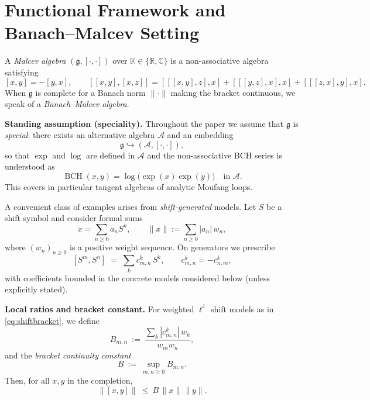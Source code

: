 \documentclass[11pt]{amsart}
\numberwithin{equation}{section}
\theoremstyle{remark}
\newcommand{\BCH}{\operatorname{BCH}}
\begin{document}
\section{Functional Framework and Banach--Malcev Setting}\label{sec:functional}

A \emph{Malcev algebra} $(\mathfrak g,[\cdot,\cdot])$ over $\mathbb K\in\{\mathbb R,\mathbb C\}$ is a non-associative algebra satisfying
\[
[x,y]=-[y,x],\qquad
[[x,y],[x,z]] = [[[x,y],z],x] + [[[y,z],x],x] + [[[z,x],y],x].
\]
When $\mathfrak g$ is complete for a Banach norm $\|\cdot\|$ making the bracket continuous, we speak of a \emph{Banach--Malcev algebra}.

\medskip
\noindent\textbf{Standing assumption (speciality).}
Throughout the paper we assume that $\mathfrak g$ is \emph{special}: there exists an alternative algebra $\mathcal A$ and an embedding
\[
\mathfrak g \hookrightarrow (\mathcal A,[\cdot,\cdot]),
\]
so that $\exp$ and $\log$ are defined in $\mathcal A$ and the non-associative BCH series is understood as
\[
\BCH(x,y)=\log\big(\exp(x)\exp(y)\big)\quad\text{in }\mathcal A.
\]
This covers in particular tangent algebras of analytic Moufang loops.

\medskip
A convenient class of examples arises from \emph{shift-generated} models. Let $S$ be a shift symbol and consider formal sums
\[
x=\sum_{n\ge0} a_n S^n,
\qquad
\|x\| := \sum_{n\ge0} |a_n|\, w_n,
\]
where $(w_n)_{n\ge0}$ is a positive weight sequence. On generators we prescribe
\begin{equation}\label{eq:shiftbracket}
[S^m,S^n] \;=\; \sum_{k} c_{m,n}^k\, S^k,
\qquad c_{m,n}^k = -c_{n,m}^k,
\end{equation}
with coefficients bounded in the concrete models considered below (unless explicitly stated).

\medskip
\noindent\textbf{Local ratios and bracket constant.}
For weighted $\ell^1$ shift models as in \eqref{eq:shiftbracket}, we define
\begin{equation}\label{eq:Bmn}
B_{m,n} \ :=\ \frac{\sum_k |c_{m,n}^k|\, w_k}{w_m w_n},
\end{equation}
and the \emph{bracket continuity constant}
\begin{equation}\label{eq:Bconst}
B \ :=\ \sup_{m,n\ge0} B_{m,n}.
\end{equation}
Then, for all $x,y$ in the completion,
\[
\|[x,y]\| \ \le\ B\,\|x\|\,\|y\|.
\]
\end{document}
